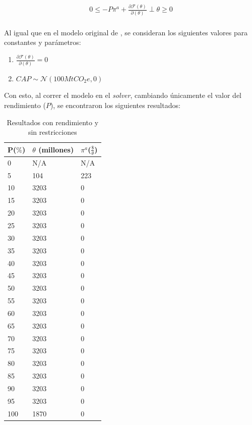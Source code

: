 \begin{equation}
\begin{array}{rrclcl}
    0\leq -P\pi^a+\frac{\partial\mathcal{F}(\theta)}{\partial(\theta)}\perp \theta \geq 0 \label{compllag1}\\
\end{array}
\end{equation}

Al igual que en el modelo original de , se consideran los siguientes valores para constantes y parámetros:
\begin{enumerate}
    \item $\frac{\partial\mathcal{F}(\theta)}{\partial(\theta)}=0$
    \item $CAP\sim \mathcal{N}(100MtCO_{2}e,0)$
\end{enumerate}

Con esto, al correr el modelo en el \textit{solver}, cambiando únicamente el valor del rendimiento ($P$), se encontraron los siguientes resultados:

\begin{table}[H]
\centering
\begin{tabular}{|l|l|l|}
\hline
\textbf{P($\%$)} & \textbf{$\theta$ (millones)} & \textbf{$\pi^a$($\frac{\$}{\theta}$)} \\ \hline
0 & N/A & N/A \\ \hline
5 & 104 & 223 \\ \hline
10 & 3203 & 0 \\ \hline
15 & 3203 & 0 \\ \hline
20 & 3203 & 0 \\ \hline
25 & 3203 & 0 \\ \hline
30 & 3203 & 0 \\ \hline
35 & 3203 & 0 \\ \hline
40 & 3203 & 0 \\ \hline
45 & 3203 & 0 \\ \hline
50 & 3203 & 0 \\ \hline
55 & 3203 & 0 \\ \hline
60 & 3203 & 0 \\ \hline
65 & 3203 & 0 \\ \hline
70 & 3203 & 0 \\ \hline
75 & 3203 & 0 \\ \hline
80 & 3203 & 0 \\ \hline
85 & 3203 & 0 \\ \hline
90 & 3203 & 0 \\ \hline
95 & 3203 & 0 \\ \hline
100 & 1870 & 0 \\ \hline
\end{tabular}
\caption{Resultados con rendimiento y sin restricciones}
\label{tabla:sinrestr}
\end{table}


